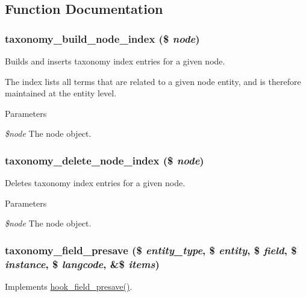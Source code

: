 \subsection{Function Documentation}
\hypertarget{group__taxonomy__index_ga3ace4aed11277879b4c85d0ee8001fdc}{
\subsubsection[{taxonomy\_\-build\_\-node\_\-index}]{\setlength{\rightskip}{0pt plus 5cm}taxonomy\_\-build\_\-node\_\-index (\$ {\em node})}}
\label{group__taxonomy__index_ga3ace4aed11277879b4c85d0ee8001fdc}
Builds and inserts taxonomy index entries for a given node.

The index lists all terms that are related to a given node entity, and is therefore maintained at the entity level.


\begin{DoxyParams}{Parameters}
\item[{\em \$node}]The node object. \end{DoxyParams}
\hypertarget{group__taxonomy__index_ga5c48fc5228e67a255b15133e218ad1e9}{
\subsubsection[{taxonomy\_\-delete\_\-node\_\-index}]{\setlength{\rightskip}{0pt plus 5cm}taxonomy\_\-delete\_\-node\_\-index (\$ {\em node})}}
\label{group__taxonomy__index_ga5c48fc5228e67a255b15133e218ad1e9}
Deletes taxonomy index entries for a given node.


\begin{DoxyParams}{Parameters}
\item[{\em \$node}]The node object. \end{DoxyParams}
\hypertarget{group__taxonomy__index_ga153d69020ee8a88cd17e1836b184972a}{
\subsubsection[{taxonomy\_\-field\_\-presave}]{\setlength{\rightskip}{0pt plus 5cm}taxonomy\_\-field\_\-presave (\$ {\em entity\_\-type}, \/  \$ {\em entity}, \/  \$ {\em field}, \/  \$ {\em instance}, \/  \$ {\em langcode}, \/  \&\$ {\em items})}}
\label{group__taxonomy__index_ga153d69020ee8a88cd17e1836b184972a}
Implements \hyperlink{group__field__types_ga5ab3a9e3c8ebccb8ca151790ec07809d}{hook\_\-field\_\-presave()}.

